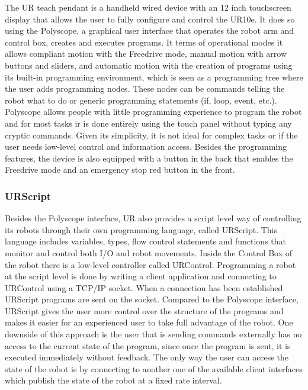 \par The UR teach pendant is a handheld wired device with an 12 inch touchscreen display that allows the user to fully configure and control the UR10e. It does so using the Polyscope, a graphical user interface that operates the robot arm and control box, creates and executes programs. It terms of operational modes it allows compliant motion with the Freedrive mode, manual motion with arrow buttons and sliders, and automatic motion with the creation of programs using its built-in programming environment, which is seen as a programming tree where the user adds programming nodes. These nodes can be commands telling the robot what to do or generic programming statements (if, loop, event, etc.). Polyscope allows people with little programming experience to program the robot and for most tasks ir is done entirely using the touch panel without typing any cryptic commands. Given its simplicity, it is not ideal for complex tasks or if the user needs low-level control and information access. Besides the programming features, the device is also equipped with a button in the back that enables the Freedrive mode and an emergency stop red button in the front.


\subsubsection{URScript}

\par Besides the Polyscope interface, UR also provides a script level way of controlling its robots through their own programming language, called URScript. This language includes variables, types, flow control statements and functions that monitor and control both I/O and robot movements. Inside the Control Box of the robot there is a low-level controller called URControl. Programming a robot at the script level is done by writing a client application and connecting to URControl using a TCP/IP socket. When a connection has been established URScript programs are sent on the socket. Compared to the Polyscope interface, URScript gives the user more control over the structure of the programs and makes it easier for an experienced user to take full advantage of the robot. One downside of this approach is the user that is sending commands externally has no access to the current state of the program, since once the program is sent, it is executed immediately without feedback. The only way the user can access the state of the robot is by connecting to another one of the available client interfaces which publish the state of the robot at a fixed rate interval.

